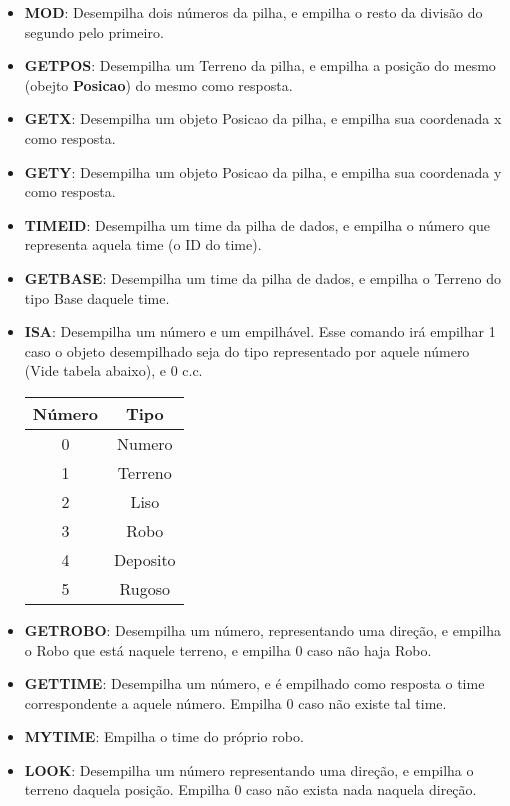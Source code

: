 \documentclass[11pt]{article}
\begin{document}
\begin{itemize}

\item \textbf{\color{red}MOD}: Desempilha dois números da pilha, e empilha o resto da divisão do segundo pelo primeiro.

\item \textbf{\color{red}GETPOS}: Desempilha um Terreno da pilha, e empilha a posição do mesmo (obejto \textbf{Posicao}) do mesmo como resposta. 

\item \textbf{\color{red}GETX}: Desempilha um objeto Posicao da pilha, e empilha sua coordenada x como resposta.

\item \textbf{\color{red}GETY}: Desempilha um objeto Posicao da pilha, e empilha sua coordenada y como resposta.

\item \textbf{\color{red}TIMEID}: Desempilha um time da pilha de dados, e empilha o número que representa aquela time (o ID do time).

\item \textbf{\color{red}GETBASE}: Desempilha um time da pilha de dados, e empilha o Terreno do tipo Base daquele time.

\item \textbf{\color{red}ISA}: Desempilha um número e um empilhável. Esse comando irá empilhar 1 caso o objeto desempilhado seja do tipo representado por aquele número (Vide tabela abaixo), e 0 c.c.
\begin{center}
	\begin{tabular}{ | c | c |}
	\hline
	Número & Tipo\\
	\hline
	0 & Numero\\
	\hline
	1 & Terreno\\
	\hline
	2 & Liso\\
	\hline
	3 & Robo\\
	\hline
	4 & Deposito\\
	\hline
	5 & Rugoso\\
	\hline
	\end{tabular}

\end{center}

\item \textbf{\color{red}GETROBO}: Desempilha um número, representando uma direção, e empilha o Robo que está naquele terreno, e empilha 0 caso não haja Robo. 

\item \textbf{\color{red}GETTIME}: Desempilha um número, e é empilhado como resposta o time correspondente a aquele número. Empilha 0 caso não existe tal time.

\item \textbf{\color{red}MYTIME}: Empilha o time do próprio robo.

\item \textbf{\color{red}LOOK}: Desempilha um número representando uma direção, e empilha o terreno daquela posição. Empilha 0 caso não exista nada naquela direção.

\end{itemize}
\end{document}
